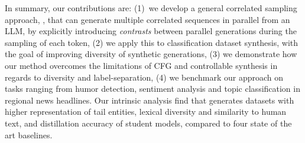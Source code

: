 In summary, our contributions are: \mbox{(1) we} develop a general correlated sampling approach, \corrsyn{}, that can generate multiple correlated sequences in parallel from an LLM, by explicitly introducing \textit{contrasts} between parallel generations during the sampling of each token, (2) we apply this to classification dataset synthesis, with the goal of improving diversity of synthetic generations, (3) we demonstrate how our method overcomes the limitations of CFG and controllable synthesis in regards to diversity and label-separation, (4) we benchmark our approach on tasks ranging from humor detection, sentiment analysis and topic classification in regional news headlines. Our intrinsic analysis find that \corrsyn{} generates datasets with higher representation of tail entities, lexical diversity and similarity to human text, and distillation accuracy of student models, compared to four state of the art baselines. 
